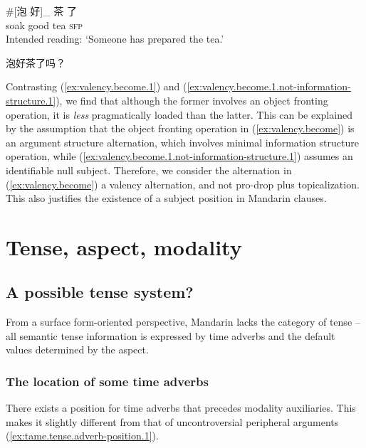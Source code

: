 \documentclass[UTF8, a4paper, oneside, scheme=plain, 12pt]{ctexrep}
\newcommand{\translate}[1]{`#1'}
\newcommand*{\category}[1]{\textsc{#1}}
\begin{document}
\begin{exe}
    \ex \begin{xlist}
        \ex\label{ex:valency.become.1.not-information-structure.1}
        \gll \#[泡 好]_{} 茶 了 \\
        soak good tea \category{sfp} \\
        \glt Intended reading: \translate{Someone has prepared the tea.}
    
        \ex\label{ex:valency.become.1.not-information-structure.2} 泡好茶了吗？
    \end{xlist}
\end{exe}

Contrasting (\ref{ex:valency.become.1})
and (\ref{ex:valency.become.1.not-information-structure.1}),
we find that although the former involves an object fronting operation,
it is \emph{less} pragmatically loaded than the latter.
This can be explained by the assumption that 
the object fronting operation in (\ref{ex:valency.become})
is an argument structure alternation,
which involves minimal information structure operation,
while (\ref{ex:valency.become.1.not-information-structure.1})
assumes an identifiable null subject.
Therefore, we consider the alternation in (\ref{ex:valency.become})
a valency alternation, and not pro-drop plus topicalization.
This also justifies the existence of a subject position in Mandarin clauses.


\chapter{Tense, aspect, modality}

\section{A possible tense system?}\label{sec:tam.tense}

From a surface form-oriented perspective, 
Mandarin lacks the category of tense -- 
all semantic tense information is 
expressed by time adverbs 
and the default values determined by the aspect.

\subsection{The location of some time adverbs}

There exists a position for time adverbs that precedes modality auxiliaries.
This makes it slightly different from that 
of uncontroversial peripheral arguments
(\ref{ex:tame.tense.adverb-position.1}).
\end{document}
